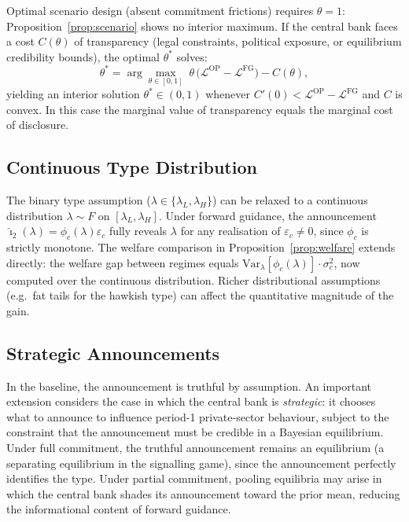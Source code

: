 Optimal scenario design (absent commitment frictions) requires $\theta = 1$:
Proposition~\ref{prop:scenario} shows no interior maximum. If the central bank
faces a cost $C(\theta)$ of transparency (legal constraints, political exposure,
or equilibrium credibility bounds), the optimal $\theta^*$ solves:
\begin{equation}
  \theta^* = \arg\max_{\theta\in[0,1]}\;
  \theta\,\bigl(\mathcal{L}^{\mathrm{OP}} - \mathcal{L}^{\mathrm{FG}}\bigr)
  - C(\theta),
  \label{eq:opt_theta}
\end{equation}
yielding an interior solution $\theta^* \in (0,1)$ whenever $C'(0) < \mathcal{L}^{\mathrm{OP}}
- \mathcal{L}^{\mathrm{FG}}$ and $C$ is convex. In this case the marginal value of
transparency equals the marginal cost of disclosure.

\subsection{Continuous Type Distribution}
\label{sec:extensions:continuous}

The binary type assumption ($\lambda \in \{\lambda_L, \lambda_H\}$) can be relaxed to
a continuous distribution $\lambda \sim F$ on $[\lambda_L, \lambda_H]$. Under
forward guidance, the announcement $\hat{\imath}_2(\lambda) = \phi_c(\lambda)\varepsilon_c$
fully reveals $\lambda$ for any realisation of $\varepsilon_c \neq 0$, since $\phi_c$
is strictly monotone. The welfare comparison in Proposition~\ref{prop:welfare}
extends directly: the welfare gap between regimes equals
$\mathrm{Var}_\lambda[\phi_c(\lambda)] \cdot \sigma_c^2$, now computed over the
continuous distribution. Richer distributional assumptions (e.g.\ fat tails for the
hawkish type) can affect the quantitative magnitude of the gain.

\subsection{Strategic Announcements}
\label{sec:strategic}

In the baseline, the announcement is truthful by assumption. An important extension
considers the case in which the central bank is \emph{strategic}: it chooses what to
announce to influence period-1 private-sector behaviour, subject to the constraint
that the announcement must be credible in a Bayesian equilibrium. Under full
commitment, the truthful announcement remains an equilibrium (a separating equilibrium
in the signalling game), since the announcement perfectly identifies the type. Under
partial commitment, pooling equilibria may arise in which the central bank shades its
announcement toward the prior mean, reducing the informational content of forward
guidance.

